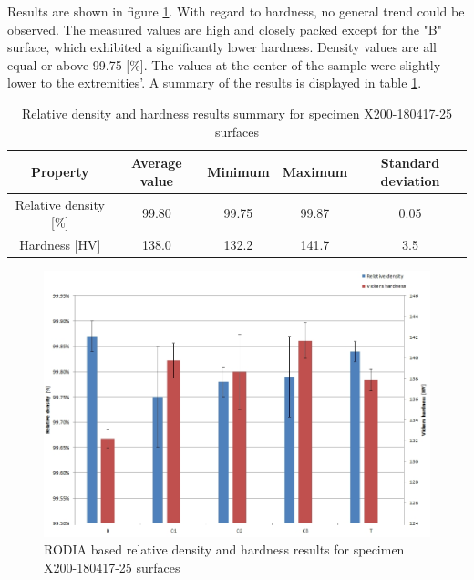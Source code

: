 Results are shown in figure \ref{fig:HD-180417}. With regard to hardness, no general trend could be observed. The measured values are high and closely packed except for the "B" surface, which exhibited a significantly lower hardness. Density values are all equal or above 99.75 [\%]. The values at the center of the sample were slightly lower to the extremities'. A summary of the results is displayed in table \ref{tab:25}.

 \begin{center}
	\begin{table}[ht]
		\begin{tabular}{|c|c |c |c| c|}
			\hline
			Property& Average value & Minimum & Maximum & Standard deviation \\
			\hline 
			\hline   
			Relative density [\%] & 99.80 & 99.75 & 99.87 & 0.05\\
			Hardness [HV] &138.0 &132.2 &141.7&3.5\\
			\hline
		\end{tabular}
		
		\caption[Relative density and hardness results summary for specimen X200-180417-25 surfaces]{Relative density and hardness results summary for specimen X200-180417-25 surfaces}
		\label{tab:25}
	\end{table}
\end{center}


\begin{figure}[ht]
\centering
\centerline{\includegraphics[scale=0.62]{Images/HD-180417}}
\decoRule
\caption[RODIA based relative density and hardness results for specimen X200-180417-25 surfaces]{RODIA based relative density and hardness results for specimen X200-180417-25 surfaces}
\label{fig:HD-180417}
\end{figure} 

